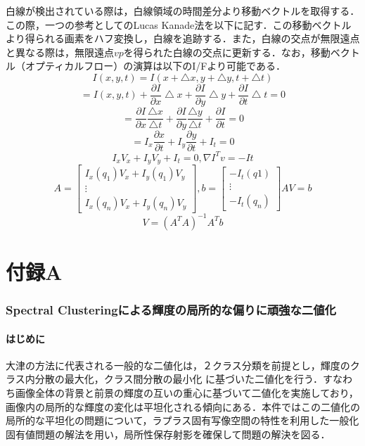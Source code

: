 \documentclass{jsarticle}
\begin{document}
白線が検出されている際は，白線領域の時間差分より移動ベクトルを取得する．この際，一つの参考としてのLucas Kanade法を以下に記す．この移動ベクトルより得られる画素をハフ変換し，白線を追跡する．また，白線の交点が無限遠点と異なる際は，無限遠点$vp$を得られた白線の交点に更新する．なお，移動ベクトル（オプティカルフロー）の演算は以下のI/Fより可能である．
\[
I(x,y,t)=I(x+\bigtriangleup x, y+ \bigtriangleup y, t+\bigtriangleup t)
\]
\[
=I(x,y,t) + \frac{\partial I}{\partial x} \bigtriangleup x + \frac{\partial I}{\partial y} \bigtriangleup y + \frac{\partial I}{\partial t} \bigtriangleup t = 0
\]
\[
=\frac{\partial I}{\partial x} \frac{\bigtriangleup x}{\bigtriangleup t} + 
\frac{\partial I}{\partial y} \frac{\bigtriangleup y}{\bigtriangleup t} +
\frac{\partial I}{\partial t} = 0
\]
\[
=I_x \frac{\partial x}{\partial t} + I_y \frac{\partial y}{\partial t} + I_t  = 0
\]
\[
I_x V_x + I_y V_y + I_t = 0, \nabla I^T v = -It
\]
\[
A=\begin{bmatrix} I_x(q_1) V_x + I_y(q_1) V_y \\ \vdots \\ I_x(q_n) V_x + I_y(q_n) V_y \end{bmatrix},
b=\begin{bmatrix} -I_t(q1) \\ \vdots \\ -I_t(q_n) \end{bmatrix}
AV=b
\]
\[
V=(A^T A)^{-1} A^T b
\]
\begin{center}
\end{center}

\part{付録A}
\label{付録A}

\section{Spectral Clusteringによる輝度の局所的な偏りに頑強な二値化}
\label{Spectral Clusteringによる輝度の局所的な偏りに頑強な二値化}

\subsection{はじめに}
\label{はじめに２}

大津の方法に代表される一般的な二値化は，２クラス分類を前提とし，輝度のクラス内分散の最大化，クラス間分散の最小化
に基づいた二値化を行う．すなわち画像全体の背景と前景の輝度の互いの重心に基づいて二値化を実施しており，画像内の局所的な輝度の変化は平坦化される傾向にある．本件ではこの二値化の局所的な平坦化の問題について，ラプラス固有写像空間の特性を利用した一般化固有値問題の解法を用い，局所性保存射影を確保して問題の解決を図る．
\end{document}
